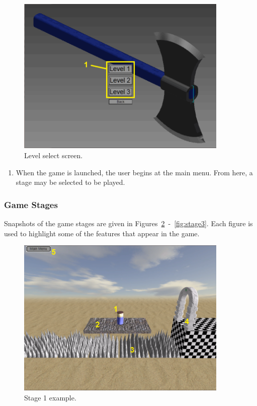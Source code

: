 \documentclass[12pt, titlepage]{article}
\begin{document}
\begin{figure}[hTB]
\begin{center}
\includegraphics[width=0.90\textwidth]{levelselect}
\caption{Level select screen.} \label{fig:levelselect}
\end{center}
\end{figure}

\begin{enumerate}
  \item When the game is launched, the user begins at the main menu.  From here, a stage may be selected to be played.
\end{enumerate}



\subsubsection{Game Stages}

Snapshots of the game stages are given in Figures~\ref*{fig:stage1}~-~\ref*{fig:stage3}.  Each figure is used to highlight some of the features that appear in the game.

\newpage

\begin{figure}[hTB]
\begin{center}
\includegraphics[width=0.90\textwidth]{stage1}
\caption{Stage 1 example.} \label{fig:stage1}
\end{center}
\end{figure}
\end{document}
